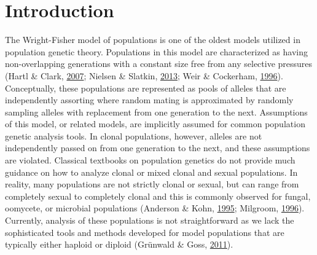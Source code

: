 \documentclass[double,11pt]{beavtex}
\begin{document}
  \section{Introduction}\label{introduction-1}
  
  The Wright-Fisher model of populations is one of the oldest models
  utilized in population genetic theory. Populations in this model are
  characterized as having non-overlapping generations with a constant size
  free from any selective pressures (Hartl \& Clark,
  \protect\hyperlink{ref-hartl1997principles}{2007}; Nielsen \& Slatkin,
  \protect\hyperlink{ref-nielsen2013introduction}{2013}; Weir \&
  Cockerham, \protect\hyperlink{ref-weir1996genetic}{1996}). Conceptually,
  these populations are represented as pools of alleles that are
  independently assorting where random mating is approximated by randomly
  sampling alleles with replacement from one generation to the next.
  Assumptions of this model, or related models, are implicitly assumed for
  common population genetic analysis tools. In clonal populations,
  however, alleles are not independently passed on from one generation to
  the next, and these assumptions are violated. Classical textbooks on
  population genetics do not provide much guidance on how to analyze
  clonal or mixed clonal and sexual populations. In reality, many
  populations are not strictly clonal or sexual, but can range from
  completely sexual to completely clonal and this is commonly observed for
  fungal, oomycete, or microbial populations (Anderson \& Kohn,
  \protect\hyperlink{ref-anderson1995clonality}{1995}; Milgroom,
  \protect\hyperlink{ref-milgroom1996recombination}{1996}). Currently,
  analysis of these populations is not straightforward as we lack the
  sophisticated tools and methods developed for model populations that are
  typically either haploid or diploid (Grünwald \& Goss,
  \protect\hyperlink{ref-grunwald2011evolution}{2011}).
  
\end{document}
